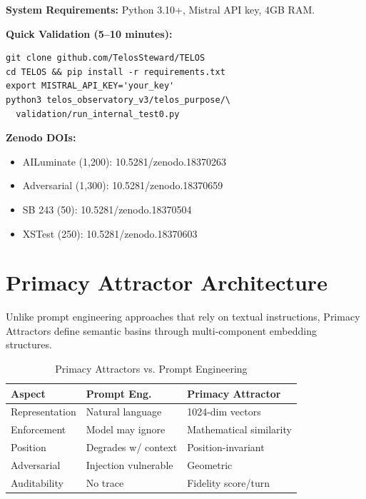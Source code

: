 \documentclass[11pt,twocolumn]{article}
\begin{document}
\textbf{System Requirements:} Python 3.10+, Mistral API key, 4GB RAM.

\textbf{Quick Validation (5--10 minutes):}
\begin{lstlisting}
git clone github.com/TelosSteward/TELOS
cd TELOS && pip install -r requirements.txt
export MISTRAL_API_KEY='your_key'
python3 telos_observatory_v3/telos_purpose/\
  validation/run_internal_test0.py
\end{lstlisting}

\textbf{Zenodo DOIs:}
\begin{itemize}
    \item AILuminate (1,200): 10.5281/zenodo.18370263
    \item Adversarial (1,300): 10.5281/zenodo.18370659
    \item SB 243 (50): 10.5281/zenodo.18370504
    \item XSTest (250): 10.5281/zenodo.18370603
\end{itemize}

\appendix
\section{Primacy Attractor Architecture}

Unlike prompt engineering approaches that rely on textual instructions, Primacy Attractors define semantic basins through multi-component embedding structures.

\begin{table}[h]
\centering
\small
\caption{Primacy Attractors vs. Prompt Engineering}
\begin{tabular}{@{}lp{2cm}p{2.5cm}@{}}
\toprule
\textbf{Aspect} & \textbf{Prompt Eng.} & \textbf{Primacy Attractor} \\
\midrule
Representation & Natural language & 1024-dim vectors \\
Enforcement & Model may ignore & Mathematical similarity \\
Position & Degrades w/ context & Position-invariant \\
Adversarial & Injection vulnerable & Geometric \\
Auditability & No trace & Fidelity score/turn \\
\bottomrule
\end{tabular}
\end{table}
\end{document}
